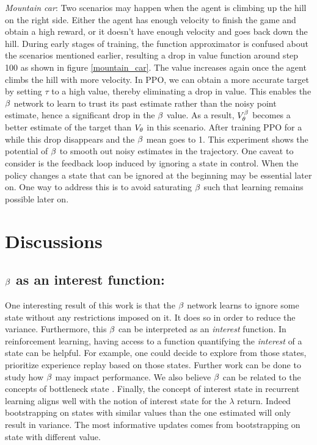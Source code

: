 \emph{Mountain car}: Two scenarios may happen when the agent is climbing up the hill on the right side. Either the agent has enough velocity to finish the game and obtain a high reward, or it doesn't have enough velocity and goes back down the hill. During early stages of training, the function approximator is confused about the scenarios mentioned earlier, resulting a drop in value function around step 100 as shown in figure \ref{mountain_car}. The value increases again once the agent climbs the hill with more velocity. In PPO, we can obtain a more accurate target by setting $\tau$ to a high value, thereby eliminating a drop in value. This enables the $\beta$ network to learn to trust its past estimate rather than the noisy point estimate, hence a significant drop in the $\beta$ value. As a result, $V^{\beta}_{\theta}$ becomes a  better estimate of the target than $V_{\theta}$ in this scenario. After training PPO for a while this drop disappears and the $\beta$ mean goes to 1. This experiment shows the potential of $\beta$ to smooth out noisy estimates in the trajectory. One caveat to consider is the feedback loop induced by ignoring a state in control. When the policy changes a state that can be ignored at the beginning may be essential later on. One way to address this is to avoid saturating $\beta$ such that learning remains possible later on.


\section{Discussions}
\subsection{$\beta$ as an interest function:} One interesting result of this work is that the $\beta$ network learns to ignore some state without any restrictions imposed on it. It does so in order to reduce the variance. Furthermore, this $\beta$ can be interpreted as an \emph{interest} function. In reinforcement learning, having access to a function quantifying the \emph{interest} \cite{mahmood2015emphatic} of a state can be helpful. For example, one could decide to explore from those states, prioritize experience replay based on those states. Further work can be done to study how $\beta$ may impact performance. We also believe $\beta$ can be related to the concepts of bottleneck state \cite{tishby2011information}. Finally, the concept of interest state in recurrent learning aligns well with the notion of interest state for the $\lambda$ return. Indeed bootstrapping on states with similar values than the one estimated will only result in variance. The most informative updates comes from bootstrapping on state with different value. 

